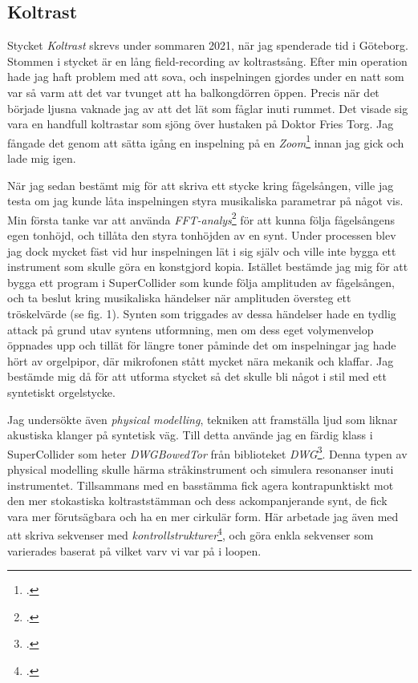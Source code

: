 \documentclass{article}
\begin{document}
\subsection{Koltrast}\nocite{KOLTRAST}
Stycket \emph{Koltrast} skrevs under sommaren 2021, när jag spenderade tid i Göteborg. Stommen i stycket är en
lång field-recording av koltrastsång. Efter min operation hade jag haft problem med att sova, och inspelningen
gjordes under en natt som var så varm att det var tvunget att ha balkongdörren öppen. Precis när det började
ljusna vaknade jag av att det lät som fåglar inuti rummet. Det visade sig vara en handfull koltrastar som
sjöng över hustaken på Doktor Fries Torg. Jag fångade det genom att sätta igång en inspelning på en  
\emph{Zoom}\footcite{zoom} innan
jag gick och lade mig igen. 

När jag sedan bestämt mig för att skriva ett stycke kring fågelsången, ville jag
testa om jag kunde låta inspelningen styra musikaliska parametrar på något vis. Min första tanke var att
använda \emph{FFT-analys}\footcite{fft} för att kunna följa
fågelsångens egen tonhöjd, och tillåta den styra tonhöjden av en synt. Under processen blev jag dock
mycket fäst vid hur inspelningen lät i sig själv och ville inte bygga ett instrument som skulle göra en
konstgjord kopia. Istället bestämde jag mig för att bygga ett program i
SuperCollider som kunde följa amplituden av fågelsången, och ta beslut kring musikaliska händelser när
amplituden översteg ett tröskelvärde (se fig. 1). Synten som triggades av dessa händelser hade en tydlig attack på grund
utav syntens utformning, men om dess eget volymenvelop öppnades upp och tillät för längre toner påminde det om
inspelningar jag hade hört av orgelpipor, där mikrofonen stått mycket nära mekanik och klaffar. 
Jag bestämde mig då för att utforma stycket så det skulle bli något i stil med ett syntetiskt orgelstycke.

Jag undersökte även \emph{physical modelling}, tekniken att framställa ljud som liknar akustiska klanger på
syntetisk väg. Till detta använde jag en färdig klass i SuperCollider som heter \emph{DWGBowedTor} från biblioteket
\emph{DWG}\footcite{dwg}. Denna typen av physical modelling skulle
härma stråkinstrument och simulera resonanser inuti instrumentet. Tillsammans med en basstämma fick agera
kontrapunktiskt mot den mer stokastiska koltraststämman och dess ackompanjerande synt, de fick vara mer
förutsägbara och ha en mer cirkulär form. Här arbetade jag även med att skriva sekvenser med
\emph{kontrollstrukturer}\footcite{ctrl}, och göra enkla sekvenser som varierades baserat på vilket varv vi
var på i loopen.
\pagebreak
\end{document}
